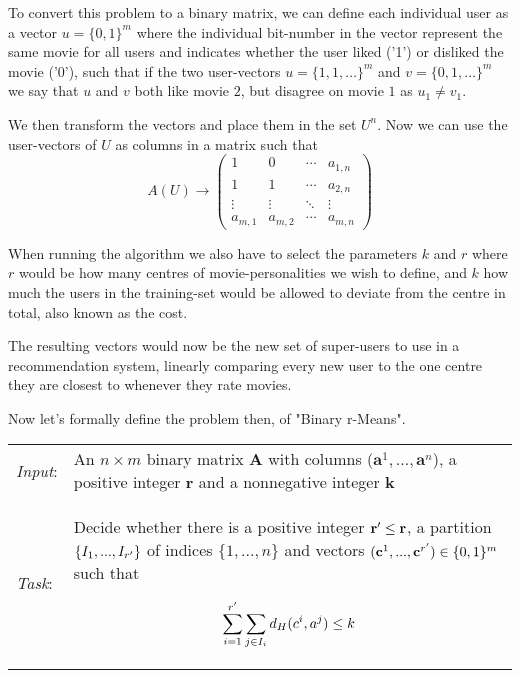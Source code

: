 \documentclass[a4paper]{article}
\begin{document}
To convert this problem to a binary matrix, we can define each individual user as a vector
$u=\{0,1\}^m$ where the individual bit-number in the vector represent the same movie for all users
and indicates whether the user liked ('1') or disliked the movie ('0'), such that if the two
user-vectors $u=\{1,1,\ldots\}^m$ and $v=\{0,1,\ldots\}^m$ we say that $u$ and $v$ both like movie $2$,
but disagree on movie $1$ as $u_1 \neq v_1$.

We then transform the vectors and place them in the set $U^n$. Now we can use the user-vectors of $U$
as columns in a matrix such that
\[
    A(U)  \rightarrow \begin{pmatrix}
        1       & 0       & \cdots & a_{1,n} \\
        1       & 1       & \cdots & a_{2,n} \\
        \vdots  & \vdots  & \ddots & \vdots  \\
        a_{m,1} & a_{m,2} & \cdots & a_{m,n}
    \end{pmatrix}
\]

When running the algorithm we also have to select the parameters $k$ and $r$ where $r$ would be
how many centres of movie-personalities we wish to define, and $k$ how much the users in
the training-set would be allowed to deviate from the centre in total, also known as the cost.

The resulting vectors would now be the new set of super-users to use in a recommendation system,
linearly comparing every new user to the one centre they are closest to whenever they rate movies.

Now let's formally define the problem then, of "Binary r-Means".
\begin{problem}
\begin{tabular}{p{}p{}}
    \textit{Input}: & An $n \times m$ binary matrix \textbf{A} with columns
    ($\textbf{a}^1,...,\textbf{a}^n$), a positive integer $\textbf{r}$ and a nonnegative
    integer $\textbf{k}$                                                                     \\

    \textit{Task}:  & Decide whether there is a positive integer $\textbf{r}\sp{\prime} \leq
        \textbf{r}$, a partition $\{I_1, ..., I_{r\sp{\prime}}\}$ of indices $\{1,...,n\}$ and vectors
    $(\textbf{c}^1,...,\textbf{c}^{r\sp{\prime}}) \in \{0,1\}^m$ such that

    \[
        \sum_{i = 1}^{r\sp{\prime}} \sum_{j \in I_i} d_H(c^i, a^j) \leq k
    \]
\end{tabular}
\end{problem}
\end{document}
